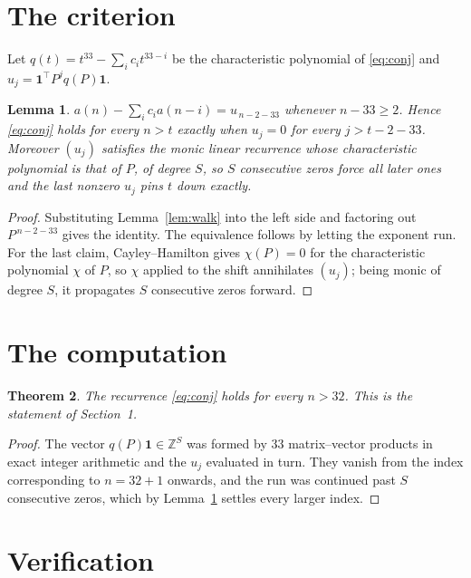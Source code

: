 \documentclass[11pt,a4paper]{article}
\theoremstyle{plain}
\newtheorem{theorem}{Theorem}
\newtheorem{lemma}[theorem]{Lemma}
\theoremstyle{definition}
\begin{document}
\section{The criterion}

Let $q(t)=t^{33}-\sum_i c_i t^{33-i}$ be the characteristic polynomial of
\eqref{eq:conj} and $u_j=\mathbf{1}^{\!\top}P^{j}q(P)\mathbf{1}$.

\begin{lemma}\label{lem:crit}
$a(n)-\sum_i c_i a(n-i)=u_{\,n-2-33}$ whenever $n-33\ge2$. Hence
\eqref{eq:conj} holds for every $n>t$ exactly when $u_j=0$ for every
$j>t-2-33$. Moreover $(u_j)$ satisfies the monic linear recurrence whose
characteristic polynomial is that of $P$, of degree $S$, so $S$ consecutive zeros force all
later ones and the last nonzero $u_j$ pins $t$ down exactly.
\end{lemma}

\begin{proof}
Substituting Lemma~\ref{lem:walk} into the left side and factoring out
$P^{\,n-2-33}$ gives the identity. The equivalence follows by letting the exponent
run. For the last claim, Cayley--Hamilton gives $\chi(P)=0$ for the characteristic
polynomial $\chi$ of $P$, so $\chi$ applied to the shift annihilates $(u_j)$; being monic of
degree $S$, it propagates $S$ consecutive zeros forward.
\end{proof}

\section{The computation}

\begin{theorem}
The recurrence \eqref{eq:conj} holds for every $n>32$. This is the statement of
Section~1.
\end{theorem}

\begin{proof}
The vector $q(P)\mathbf{1}\in\mathbb{Z}^{S}$ was formed by $33$ matrix--vector
products in exact integer arithmetic and the $u_j$ evaluated in turn. They vanish from the
index corresponding to $n=32+1$ onwards, and the run was continued past $S$ consecutive
zeros, which by Lemma~\ref{lem:crit} settles every larger index.
\end{proof}

\section{Verification}
\end{document}
